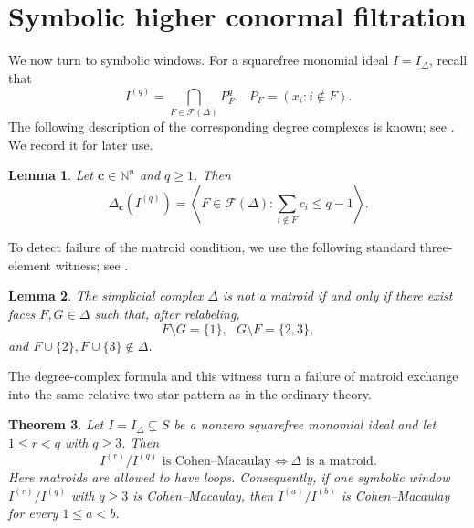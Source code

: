\documentclass[12pt]{amsart}
\theoremstyle{plain}
\newtheorem{theorem}{Theorem}[section]
\newtheorem{lemma}[theorem]{Lemma}
\theoremstyle{definition}
\theoremstyle{remark}
\begin{document}
\section{Symbolic higher conormal filtration}\label{sec:symbolic}

We now turn to symbolic windows. For a squarefree monomial ideal
$I=I_\Delta$, recall that
$$
I^{(q)}=\bigcap_{F\in\mathcal F(\Delta)}P_F^q,
\text{ }
P_F=(x_i:i\notin F).
$$
The following description of the corresponding degree complexes is known;
see \cite{MinhTrung,Takayama}. We record it for later use.

\begin{lemma}\label{lem:symbolic-degree}
Let $\mathbf c\in\mathbb N^n$ and $q\ge1$. Then
$$
\Delta_{\mathbf c}(I^{(q)})
=
\left\langle
F\in\mathcal F(\Delta):
\sum_{i\notin F}c_i\le q-1
\right\rangle.
$$
\end{lemma}
To detect failure of the matroid condition, we use the following standard
three-element witness; see \cite[Theorem~39.1]{Schrijver}.

\begin{lemma}\label{lem:matroid-witness}
The simplicial complex $\Delta$ is not a matroid if and only if there exist
faces $F,G\in\Delta$ such that, after relabeling,
$$
F\setminus G=\{1\},
\text{ }
G\setminus F=\{2,3\},
$$
and $F\cup\{2\},F\cup\{3\}\notin\Delta$.
\end{lemma}

The degree-complex formula and this witness turn a failure of matroid exchange
into the same relative two-star pattern as in the ordinary theory.

\begin{theorem}\label{thm:symbolic}
Let $I=I_\Delta\subsetneq S$ be a nonzero squarefree monomial ideal and let
$1\le r<q$ with $q\ge3$. Then
$$
I^{(r)}/I^{(q)}\text{ is Cohen--Macaulay}
\Longleftrightarrow
\Delta\text{ is a matroid}.
$$
Here matroids are allowed to have loops. Consequently, if one symbolic window
$I^{(r)}/I^{(q)}$ with $q\ge3$ is Cohen--Macaulay, then
$I^{(a)}/I^{(b)}$ is Cohen--Macaulay for every $1\le a<b$.
\end{theorem}
\end{document}
